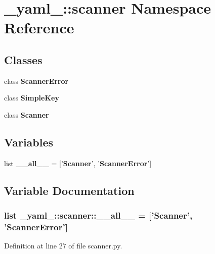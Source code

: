 \section{\_\-yaml\_\-::scanner Namespace Reference}
\label{namespace__yaml___1_1scanner}


\subsection*{Classes}
\begin{CompactItemize}
\item 
class {\bf ScannerError}
\item 
class {\bf SimpleKey}
\item 
class {\bf Scanner}
\end{CompactItemize}
\subsection*{Variables}
\begin{CompactItemize}
\item 
list {\bf \_\-\_\-all\_\-\_\-} = ['{\bf Scanner}', '{\bf ScannerError}']
\end{CompactItemize}


\subsection{Variable Documentation}
\subsubsection{\setlength{\rightskip}{0pt plus 5cm}list {\bf \_\-yaml\_\-::scanner::\_\-\_\-all\_\-\_\-} = ['{\bf Scanner}', '{\bf ScannerError}']\hspace{0.3cm}{\tt  [static]}}\label{namespace__yaml___1_1scanner_8ddca2bb9f308296b636a3c9f4280f9b}




Definition at line 27 of file scanner.py.